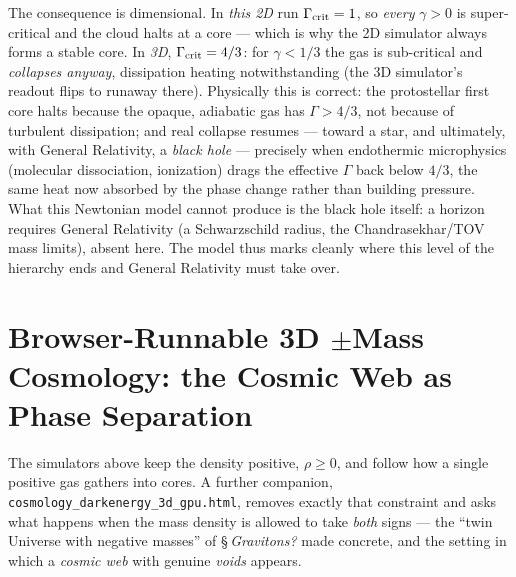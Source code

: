 The consequence is dimensional. In \emph{this 2D} run $\Gamma_{\rm crit}=1$, so
\emph{every} $\gamma>0$ is super-critical and the cloud halts at a core --- which
is why the 2D simulator always forms a stable core. In \emph{3D},
$\Gamma_{\rm crit}=4/3$: for $\gamma<1/3$ the gas is sub-critical and
\emph{collapses anyway}, dissipation heating notwithstanding (the 3D simulator's
readout flips to runaway there). Physically this is correct: the protostellar
first core halts because the opaque, adiabatic gas has $\Gamma>4/3$, not because
of turbulent dissipation; and real collapse resumes --- toward a star, and
ultimately, with General Relativity, a \emph{black hole} --- precisely when
endothermic microphysics (molecular dissociation, ionization) drags the effective
$\Gamma$ back below $4/3$, the same heat now absorbed by the phase change rather
than building pressure. What this Newtonian model cannot produce is the black
hole itself: a horizon requires General Relativity (a Schwarzschild radius, the
Chandrasekhar/TOV mass limits), absent here. The model thus marks cleanly where
this level of the hierarchy ends and General Relativity must take over.

\section{Browser-Runnable 3D $\pm$Mass Cosmology: the Cosmic Web as Phase Separation}\label{sec:pmmass_web}

The simulators above keep the density positive, $\rho\ge0$, and follow how a single positive gas gathers into
cores. A further companion, \texttt{cosmology\_darkenergy\_3d\_gpu.html}, removes exactly that constraint and asks
what happens when the mass density is allowed to take \emph{both} signs --- the ``twin Universe with negative
masses'' of \S\,\textit{Gravitons?} made concrete, and the setting in which a \emph{cosmic web} with genuine
\emph{voids} appears.

